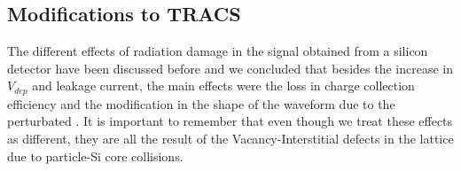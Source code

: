 
\subsection{Modifications to TRACS}

The different effects of radiation damage in the signal obtained from a silicon detector have been discussed before and we concluded that besides the increase in $V_{dep}$ and leakage current, the main effects were the loss in charge collection efficiency and the modification in the shape of the waveform due to the perturbated \neff. It is important to remember that even though we treat these effects as different, they are all the result of the Vacancy-Interstitial defects in the lattice due to particle-Si core collisions.




